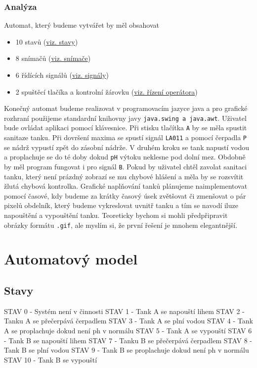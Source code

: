 \documentclass[12pt, a4paper]{article}
\begin{document}
\subsubsection{Analýza}

Automat, který budeme vytvářet by měl obsahovat
\begin{itemize}
    \item 10 stavů (\hyperref[sec: stavy]{viz. stavy})
    \item 8 snímačů (\hyperref[sec: snimace]{viz. snímače})
    \item 6 řídících signálů (\hyperref[sec: signaly]{viz. signály})
    \item 2 spuštěcí tlačíka a kontrolní žárovku (\hyperref[sec: operator]{viz. řízení operátora})
\end{itemize}

Konečný automat budeme realizovat v programovacím jazyce java a pro grafické rozhraní použijeme standardní knihovny
javy \texttt{java.swing a java.awt}. Uživatel bude ovládat aplikaci pomocí klávesnice. Při stisku tlačítka \texttt{A} by se měla spustit
sanitaze tanku. Při dovršení maxima se spustí signál \texttt{LA011} a pomocí čerpadla \texttt{P} se nádrž vypustí
zpět do zásobní nádrže. V druhém kroku se tank napustí vodou a proplachuje se do té doby dokud \texttt{pH} výtoku neklesne pod dolní mez.
Obdobně by měl program fungovat i pro signál \texttt{B}. Pokud by uživatel chtěl zavolat sanitaci tanku, který není prázdný zobrazí se mu
chybové hlášení a měla by se rozsvítit žlutá chybová kontrolka. Grafické naplňování tanků plánujeme naimplementovat
pomocí časové, kdy budeme za krátky časový úsek zvětšovat či zmenšovat o pár pixelů obdelník, který budeme vykreslovat uvnitř tanku
a tím se navodí iluze napouštění a vypouštění tanku. Teoreticky bychom si mohli předpřipravit obrázky formátu \texttt{.gif}, ale myslím
si, že první řešení je mnohem elegantnější.

\section{Automatový model}

\subsection{Stavy}
STAV 0 - Systém není v činnosti \newline 
STAV 1 - Tank A se napouští lihem \newline 
STAV 2 - Tanku A se přečerpává čerpadlem \newline 
STAV 3 - Tank A se plní vodou \newline 
STAV 4 - Tank A se proplachuje dokud není ph v normálu \newline 
STAV 5 - Tank A se vypouští \newline 
STAV 6 - Tank B se napouští lihem \newline 
STAV 7 - Tanku B se přečerpává čerpadlem \newline 
STAV 8 - Tank B se plní vodou \newline 
STAV 9 - Tank B se proplachuje dokud není ph v normálu \newline 
STAV 10 - Tank B se vypouští 
\end{document}
